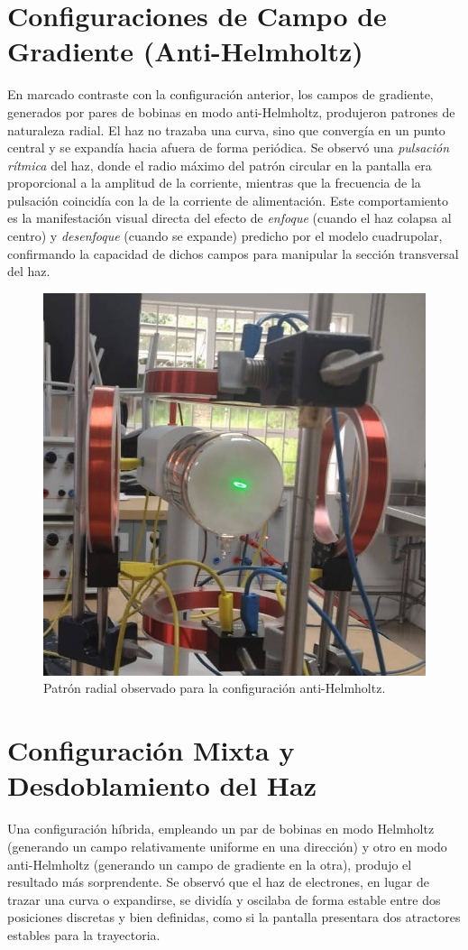 \section{Configuraciones de Campo de Gradiente (Anti-Helmholtz)}

En marcado contraste con la configuración anterior, los campos de
gradiente, generados por pares de bobinas en modo anti-Helmholtz,
produjeron patrones de naturaleza radial. El haz no trazaba una curva,
sino que convergía en un punto central y se expandía hacia afuera de forma
periódica. Se observó una \emph{pulsación rítmica} del haz, donde el radio
máximo del patrón circular en la pantalla era proporcional a la amplitud de
la corriente, mientras que la frecuencia de la pulsación coincidía con la
de la corriente de alimentación. Este comportamiento es la manifestación
visual directa del efecto de \emph{enfoque} (cuando el haz colapsa al
centro) y \emph{desenfoque} (cuando se expande) predicho por el modelo
cuadrupolar, confirmando la capacidad de dichos campos para manipular la
sección transversal del haz.

\begin{figure}[htbp!]
	\centering
	\includegraphics[width=0.6\linewidth]{../Figures/confienment.jpg}
	\caption{Patrón radial observado para la configuración anti-Helmholtz.}
	\label{fig:resultados_enfoque}
\end{figure}

\section{Configuración Mixta y Desdoblamiento del Haz}

Una configuración híbrida, empleando un par de bobinas en modo Helmholtz
(generando un campo relativamente uniforme en una dirección) y otro en modo
anti-Helmholtz (generando un campo de gradiente en la otra), produjo el
resultado más sorprendente. Se observó que el haz de electrones, en lugar
de trazar una curva o expandirse, se dividía y oscilaba de forma estable
entre dos posiciones discretas y bien definidas, como si la pantalla
presentara dos atractores estables para la trayectoria.

